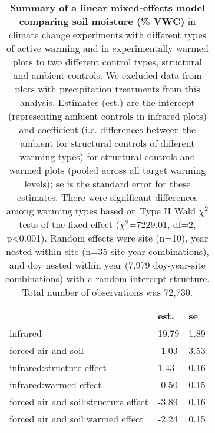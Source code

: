 \documentclass{article}
\begin{document}
\begin{table}[ht]
\centering
\caption{\textbf{Summary of a linear mixed-effects model comparing soil moisture (\% VWC)} in climate change experiments with different types of active warming and in experimentally warmed plots to two different control types, structural and ambient controls. We excluded data from plots with precipitation treatments from this analysis. Estimates (est.) are the intercept (representing ambient controls in infrared plots) and coefficient (i.e. differences between the ambient for structural controls of different warming types) for structural controls and warmed plots (pooled across all target warming levels); se is the standard error for these estimates. There were significant differences among warming types based on Type II Wald $\chi^{2}$ tests of the fixed effect ($\chi^{2}$=7229.01, df=2, p<0.001). Random effects were site (n=10), year nested within site (n=35 site-year combinations), and doy nested within year (7,979 doy-year-site combinations) with a random intercept structure. Total number of observations was 72,730.} 
\label{table:warmsoilmois}
\begingroup\footnotesize
\begin{tabular}{|p{}|p{}p{}|}
  \hline
 & est. & se \\ 
  \hline
infrared & 19.79 & 1.89 \\ 
  forced air and soil & -1.03 & 3.53 \\ 
  infrared:structure effect & 1.43 & 0.16 \\ 
  infrared:warmed effect & -0.50 & 0.15 \\ 
  forced air and soil:structure effect & -3.89 & 0.16 \\ 
  forced air and soil:warmed effect & -2.24 & 0.15 \\ 
   \hline
\end{tabular}
\endgroup
\end{table}\clearpage
\end{document}
